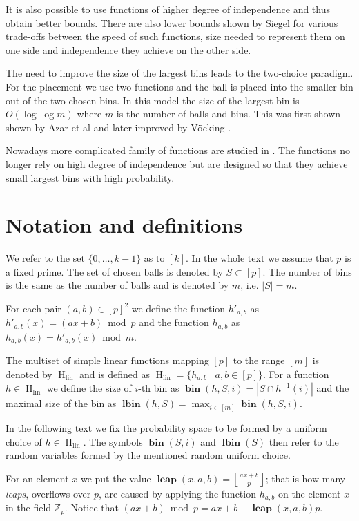 \documentclass{article}
\newcommand{\hlin}{\operatorname{H}_{\operatorname{lin}}}
\newcommand{\leap}[3]{\operatorname{\mathbf{leap}}({#1}, {#2}, {#3})}
\newcommand{\bin}[3]{\operatorname{\mathbf{bin}}({#1}, {#2}, {#3})}
\newcommand{\lbin}[2]{\operatorname{\mathbf{lbin}}({#1}, {#2})}
\newcommand{\vbin}[2]{\operatorname{\mathbf{bin}}({#1}, {#2})}
\newcommand{\vlbin}[1]{\operatorname{\mathbf{lbin}}({#1})}
\begin{document}
It is also possible to use functions of higher degree of independence and thus obtain better bounds. There are also lower bounds shown by Siegel \cite{siegel} for various trade-offs between the speed of such functions, size needed to represent them on one side and independence they achieve on the other side.

The need to improve the size of the largest bins leads to the two-choice paradigm. For the placement we use two functions and the ball is placed into the smaller bin out of the two chosen bins. In this model the size of the largest bin is $O(\log \log m)$ where $m$ is the number of balls and bins. This was first shown shown by Azar et al \cite{azar} and later improved by V\"{o}cking \cite{vocking}.

Nowadays more complicated family of functions are studied in \cite{wieder}. The functions no longer rely on high degree of independence but are designed so that they achieve small largest bins with high probability.

\section{Notation and definitions}
\label{sec:notation}
We refer to the set $\{0, \dots, k - 1\}$ as to $[k]$. 
In the whole text we assume that $p$ is a fixed prime. 
The set of chosen balls is denoted by $S \subset [p]$.
The number of bins is the same as the number of balls and is denoted by $m$, i.e. $|S| = m$.

For each pair $(a, b) \in [p]^2$ we define the function $h'_{a, b}$ as $h'_{a, b}(x) = (ax + b) \bmod p$ and the function $h_{a, b}$ as $h_{a, b}(x) = h'_{a, b}(x) \bmod m$.

The multiset of simple linear functions mapping $[p]$ to the range $[m]$ is denoted by $\hlin$ and is defined as $\hlin = \{h_{a, b} \mid a, b \in [p] \}$.
For a function $h \in \hlin$ we define the size of $i$-th bin as $\bin{h}{S}{i} = |S \cap h^{-1}(i)|$ and the maximal size of the bin as $\lbin{h}{S} = \max_{i \in [m]} \bin{h}{S}{i}$.

In the following text we fix the probability space to be formed by a uniform choice of $h \in \hlin$.
The symbols $\vbin{S}{i}$ and $\vlbin{S}$ then refer to the random variables formed by the mentioned random uniform choice.

For an element $x$ we put the value $\leap{x}{a}{b} = \left\lfloor\frac{ax + b}{p}\right\rfloor$; that is how many \emph{leaps}, overflows over $p$, are caused by applying the function $h_{a, b}$ on the element $x$ in the field $\mathbb{Z}_p$. Notice that $(ax + b) \bmod  p = ax + b - \leap{x}{a}{b}p$.
\end{document}
